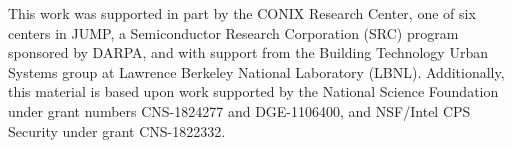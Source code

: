 \begin{acknowledgements}
\vspace*{\fill}
\noindent\small{This work was supported in part by the CONIX Research Center,
one of six centers in JUMP, a Semiconductor Research Corporation
(SRC) program sponsored by DARPA, 
and with support from the
Building Technology Urban Systems group at Lawrence Berkeley
National Laboratory (LBNL). 
Additionally, this material is
based upon work supported by the National Science Foundation
under grant numbers CNS-1824277 and DGE-1106400, and NSF/Intel CPS Security under grant CNS-1822332.
}
\end{acknowledgements}